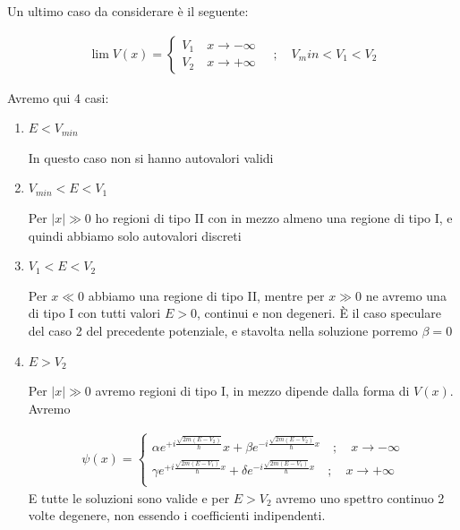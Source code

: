 Un ultimo caso da considerare è il seguente:

\begin{align}
\lim V(x)=
\left\{
\begin{array}{cc}
V_1 \quad x\rightarrow -\infty \\
V_2 \quad x\rightarrow +\infty
\end{array}
\right. \quad ; \quad V_min<V_1<V_2
\end{align}

\begin{figure}[!htb]
\end{figure}

Avremo qui 4 casi:

\begin{enumerate}
	\item $E<V_{min}$
	
	In questo caso non si hanno autovalori validi
	
	\item $V_{min}<E<V_1$
	
	Per $|x|\gg 0$ ho regioni di tipo II con in mezzo almeno una regione di tipo I, e quindi abbiamo solo autovalori discreti
	
	\item $V_1<E<V_2$
	
	Per $x \ll 0$ abbiamo una regione di tipo II, mentre per $x \gg 0$ ne avremo una di tipo I con tutti valori $E>0$, continui e non degeneri. È il caso speculare del caso 2 del precedente potenziale, e stavolta nella soluzione porremo $\beta=0$
	
	\item $E>V_2$
	
	Per $|x|\gg 0$ avremo regioni di tipo I, in mezzo dipende dalla forma di $V(x)$.
		Avremo 
	
	\begin{align}
	\psi(x)= \left\{
	\begin{array}{cc}
	\alpha e^{+i\frac{\sqrt{2m(E-V_2)}}{\hbar}}x + \beta e^{-i \frac{\sqrt{2m(E-V_2)}}{\hbar}x} \quad;\quad  x\rightarrow -\infty \\
	\gamma e^{+i \frac{\sqrt{2m(E-V_1)}}{\hbar}x} + \delta e^{-i \frac{\sqrt{2m(E-V_1)}}{\hbar}x} \quad;\quad  x\rightarrow +\infty \\
	\end{array}
	\right.
	\end{align}
	E tutte le soluzioni sono valide e per $E>V_2$ avremo uno spettro continuo 2 volte degenere, non essendo i coefficienti indipendenti.
\end{enumerate}

